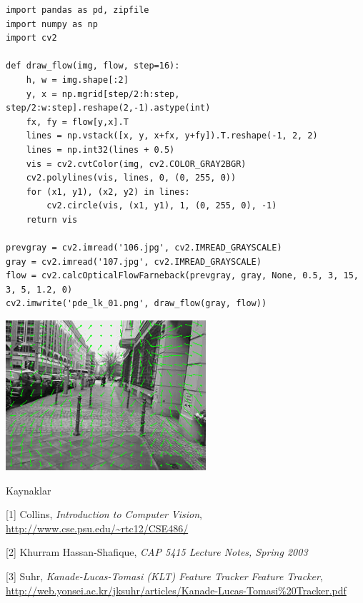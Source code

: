 \documentclass[12pt,fleqn]{article}\usepackage{../../common}
\begin{document}
\begin{verbatim}
import pandas as pd, zipfile
import numpy as np
import cv2

def draw_flow(img, flow, step=16):
    h, w = img.shape[:2]
    y, x = np.mgrid[step/2:h:step, step/2:w:step].reshape(2,-1).astype(int)
    fx, fy = flow[y,x].T
    lines = np.vstack([x, y, x+fx, y+fy]).T.reshape(-1, 2, 2)
    lines = np.int32(lines + 0.5)
    vis = cv2.cvtColor(img, cv2.COLOR_GRAY2BGR)
    cv2.polylines(vis, lines, 0, (0, 255, 0))
    for (x1, y1), (x2, y2) in lines:
        cv2.circle(vis, (x1, y1), 1, (0, 255, 0), -1)
    return vis

prevgray = cv2.imread('106.jpg', cv2.IMREAD_GRAYSCALE)
gray = cv2.imread('107.jpg', cv2.IMREAD_GRAYSCALE)
flow = cv2.calcOpticalFlowFarneback(prevgray, gray, None, 0.5, 3, 15, 3, 5, 1.2, 0)
cv2.imwrite('pde_lk_01.png', draw_flow(gray, flow))
\end{verbatim}

\includegraphics[width=20em]{pde_lk_01.png}

Kaynaklar

[1] Collins, {\em Introduction to Computer Vision},  \url{http://www.cse.psu.edu/~rtc12/CSE486/}

[2] Khurram Hassan-Shafique, {\em CAP 5415 Lecture Notes, Spring 2003}

[3] Suhr, {\em Kanade-Lucas-Tomasi (KLT) Feature Tracker Feature Tracker}, \url{http://web.yonsei.ac.kr/jksuhr/articles/Kanade-Lucas-Tomasi%20Tracker.pdf}
\end{document}
